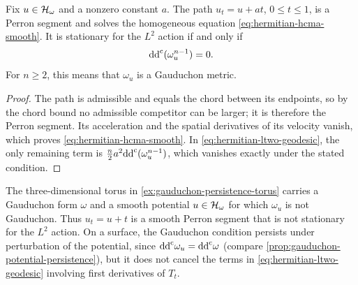 \begin{corollary}
\label{cor:translations-gauduchon}
Fix $u\in\mathcal H_\omega$ and a nonzero constant $a$. The path $u_t=u+at$, $0\leq t\leq1$, is a Perron segment and solves the homogeneous equation \eqref{eq:hermitian-hcma-smooth}. It is stationary for the $L^2$ action if and only if
\[
 \mathrm{dd}^{\mathrm{c}}(\omega_u^{n-1})=0.
\]
For $n\geq2$, this means that $\omega_u$ is a Gauduchon metric.
\end{corollary}
\begin{proof}
The path is admissible and equals the chord between its endpoints, so by the chord bound no admissible competitor can be larger; it is therefore the Perron segment. Its acceleration and the spatial derivatives of its velocity vanish, which proves \eqref{eq:hermitian-hcma-smooth}. In \eqref{eq:hermitian-ltwo-geodesic}, the only remaining term is
$\frac n2a^2\mathrm{dd}^{\mathrm{c}}(\omega_u^{n-1})$, which vanishes exactly under the stated condition.
\end{proof}

The three-dimensional torus in \cref{ex:gauduchon-persistence-torus} carries a Gauduchon form $\omega$ and a smooth potential $u\in\mathcal H_\omega$ for which $\omega_u$ is not Gauduchon. Thus $u_t=u+t$ is a smooth Perron segment that is not stationary for the $L^2$ action. On a surface, the Gauduchon condition persists under perturbation of the potential, since $\mathrm{dd}^{\mathrm{c}}\omega_u=\mathrm{dd}^{\mathrm{c}}\omega$ (compare \cref{prop:gauduchon-potential-persistence}), but it does not cancel the terms in \eqref{eq:hermitian-ltwo-geodesic} involving first derivatives of $T_t$.


